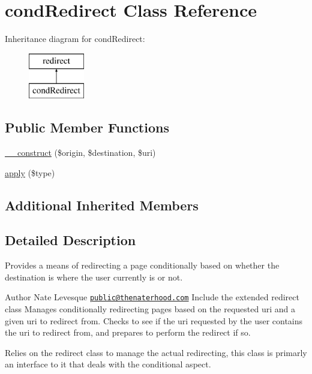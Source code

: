 \hypertarget{classcondRedirect}{\section{cond\-Redirect Class Reference}
\label{classcondRedirect}
}
Inheritance diagram for cond\-Redirect\-:\begin{figure}[H]
\begin{center}
\leavevmode
\includegraphics[height=2.000000cm]{classcondRedirect}
\end{center}
\end{figure}
\subsection*{Public Member Functions}
\begin{DoxyCompactItemize}
\item 
\hyperlink{classcondRedirect_ad18d689973246f0b672e27b969f3ce31}{\-\_\-\-\_\-construct} (\$origin, \$destination, \$uri)
\item 
\hyperlink{classcondRedirect_aeeb36f32e9bf27e34c5806efeb41d35a}{apply} (\$type)
\end{DoxyCompactItemize}
\subsection*{Additional Inherited Members}


\subsection{Detailed Description}
Provides a means of redirecting a page conditionally based on whether the destination is where the user currently is or not. \begin{DoxyAuthor}{Author}
Nate Levesque \href{mailto:public@thenaterhood.com}{\tt public@thenaterhood.\-com} Include the extended redirect class Manages conditionally redirecting pages based on the requested uri and a given uri to redirect from. Checks to see if the uri requested by the user contains the uri to redirect from, and prepares to perform the redirect if so.
\end{DoxyAuthor}
Relies on the redirect class to manage the actual redirecting, this class is primarly an interface to it that deals with the conditional aspect. 

